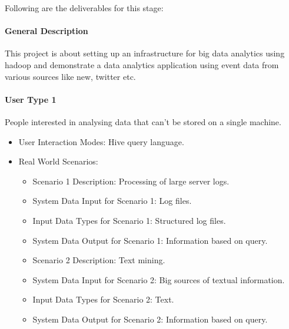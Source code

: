 Following are the deliverables for this stage:

\paragraph{General Description}
This project is about setting up an infrastructure for big data analytics using hadoop and demonstrate a data analytics application using event data from various sources like new, twitter etc.

\paragraph{User Type 1}
People interested in analysing data that can't be stored on a single machine.
\begin{itemize}
\item User Interaction Modes: Hive query language.
\item Real World Scenarios:
  \begin{itemize}
  \item Scenario 1 Description: Processing of large server logs.
  \item System Data Input for Scenario 1: Log files.
  \item Input Data Types for Scenario 1: Structured log files.
  \item System Data Output for Scenario 1: Information based on query.
  \item Scenario 2 Description: Text mining.
  \item System Data Input for Scenario 2: Big sources of textual information.
  \item Input Data Types for Scenario 2: Text.
  \item System Data Output for Scenario 2: Information based on query.
  \end{itemize}
\end{itemize}

